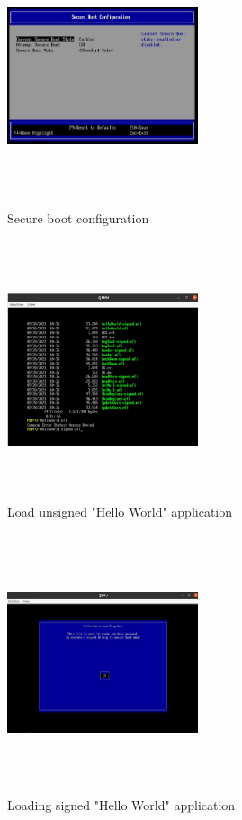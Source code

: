\documentclass[a4paper,fleqn]{cas-dc}
\begin{document}
\begin{figure}[hbt!]
	\centering
	\includegraphics[width=0.5\textwidth,height=3in]{figs/SecureBootConfiguration.JPG}
	\caption{Secure boot configuration}
\end{figure}

\begin{figure}[hbt!]
	\centering
	\includegraphics[width=0.5\textwidth,height=3in]{figs/SecureBootUnsigned.JPG}
	\caption{Load unsigned "Hello World" application}
\end{figure}

\begin{figure}[hbt!]
	\centering
	\includegraphics[width=0.5\textwidth,height=3in]{figs/SecureBootSigned.JPG}
	\caption{Loading signed "Hello World" application}
\end{figure}
\end{document}
